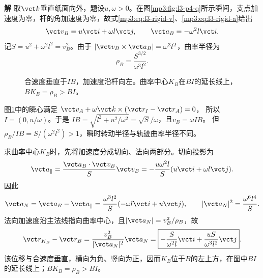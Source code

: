 \documentclass[11pt,openany,fontset=fandol]{ctexbook}
\theoremstyle{definition}\newtheorem{example}{例}[chapter]\newtheorem{exercise}{习题}[chapter]
\newcommand{\SolutionStart}{\par\medskip\ifdim\pagetotal>0pt\ifdim\dimexpr\pagegoal-\pagetotal\relax<3\baselineskip\newpage\fi\fi\noindent\textbf{解}\quad\ignorespaces}
\newenvironment{solution}{\SolutionStart}{\par\medskip}
\begin{document}
\begin{solution}
取$\vct k$垂直纸面向外，题设$u,\omega>0$。在图\ref{mp3:fig:l3-p4-q}所示瞬间，支点加速度为零，杆的角加速度为零，故式\eqref{mp3:eq:l3-rigid-v}、\eqref{mp3:eq:l3-rigid-a}给出
\[
 \vct v_B=u\vct i+\omega l\vct j,\qquad
 \vct a_B=-\omega^2l\vct i.
\]
记$S=u^2+\omega^2l^2=v_B^2$。由于
$|\vct v_B\times\vct a_B|=\omega^3l^2$，曲率半径为
\[
 \boxed{\rho_B=\frac{S^{3/2}}{\omega^3l^2}}.
\]
\begin{figure}[H]\centering
{}
\caption{合速度垂直于$IB$，加速度沿杆向左。曲率中心$K_B$在$BI$的延长线上，$BK_B=\rho_B>BI$。}\label{mp3:fig:l3-p4-s}
\end{figure}
图\ref{mp3:fig:l3-p4-s}中的瞬心满足
$\vct v_A+\omega\vct k\times(\vct r_I-\vct r_A)=0$，
所以$I=(0,u/\omega)$。于是
$IB=\sqrt{l^2+u^2/\omega^2}=\sqrt S/\omega$，且$v_B=\omega IB$。
但$\rho_B/IB=S/(\omega^2l^2)>1$，瞬时转动半径与轨迹曲率半径不同。

求曲率中心$K_B$时，先将加速度分成切向、法向两部分。切向投影为
\[
 \vct a_\parallel
 =\frac{\vct a_B\cdot\vct v_B}{S}\vct v_B
 =-\frac{u\omega^2l}{S}(u\vct i+\omega l\vct j).
\]
因此
\[
 \vct a_N=\vct a_B-\vct a_\parallel
 =\frac{\omega^3l^2}{S}(-\omega l\vct i+u\vct j),
 \qquad |\vct a_N|^2=\frac{\omega^6l^4}{S}.
\]
法向加速度沿主法线指向曲率中心，且$|\vct a_N|=v_B^2/\rho_B$，故
\[
 \vct r_{K_B}-\vct r_B
 =\frac{v_B^2}{|\vct a_N|^2}\vct a_N
 =\boxed{-\frac{S}{\omega^2l}\vct i
 +\frac{uS}{\omega^3l^2}\vct j}.
\]
该位移与合速度垂直，横向为负、竖向为正，因而$K_B$位于$B$的左上方，在图中$BI$的延长线上；$BK_B=\rho_B>BI$。
\end{solution}
\end{document}
